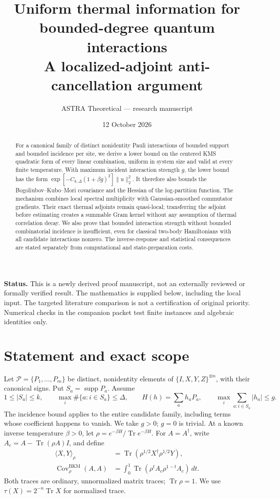 \documentclass[11pt]{article}
\title{Uniform thermal information for bounded-degree quantum interactions\\[4pt]\large A localized-adjoint anti-cancellation argument}
\author{ASTRA Theoretical --- research manuscript}
\date{12 October 2026}
\theoremstyle{remark}\newtheorem{remark}[theorem]{Remark}
\DeclareMathOperator{\Tr}{Tr}\DeclareMathOperator{\supp}{supp}\DeclareMathOperator{\ad}{ad}\DeclareMathOperator{\Var}{Var}\DeclareMathOperator{\Cov}{Cov}\DeclareMathOperator{\rank}{rank}\DeclareMathOperator{\dist}{dist}
\newcommand{\ip}[2]{\langle #1,#2\rangle_\rho}
\begin{document}
\maketitle
\begin{abstract}
For a canonical family of distinct nonidentity Pauli interactions of bounded support and bounded incidence per site, we derive a lower bound on the centered KMS quadratic form of every linear combination, uniform in system size and valid at every finite temperature. With maximum incident interaction strength $g$, the lower bound has the form $\exp[-C_{k,\Delta}(1+\beta g)^2]\|u\|_2^2$. It therefore also bounds the Bogoliubov--Kubo--Mori covariance and the Hessian of the log-partition function. The mechanism combines local spectral multiplicity with Gaussian-smoothed commutator gradients. Their exact thermal adjoints remain quasi-local; transferring the adjoint before estimating creates a summable Gram kernel without any assumption of thermal correlation decay. We also prove that bounded interaction strength without bounded combinatorial incidence is insufficient, even for classical two-body Hamiltonians with all candidate interactions nonzero. The inverse-response and statistical consequences are stated separately from computational and state-preparation costs.
\end{abstract}
\noindent\textbf{Status.} This is a newly derived proof manuscript, not an externally reviewed or formally verified result. The mathematics is supplied below, including the local input. The targeted literature comparison is not a certification of original priority. Numerical checks in the companion packet test finite instances and algebraic identities only.

\section{Statement and exact scope}
Let $\mathcal P=\{P_1,\ldots,P_m\}$ be distinct, nonidentity elements of $\{I,X,Y,Z\}^{\otimes n}$, with their canonical signs. Put $S_a=\supp P_a$. Assume
\begin{equation}\label{eq:assumptions}
 1\le |S_a|\le k,\qquad
 \max_i\#\{a:i\in S_a\}\le\Delta,\qquad
 H(h)=\sum_a h_aP_a,\qquad
 \max_i\sum_{a:i\in S_a}|h_a|\le g.
\end{equation}
The incidence bound applies to the entire candidate family, including terms whose coefficient happens to vanish. We take $g>0$; $g=0$ is trivial. At a known inverse temperature $\beta>0$, let $\rho=e^{-\beta H}/\Tr e^{-\beta H}$. For $A=A^\dagger$, write $A_c=A-\Tr(\rho A)I$, and define
\begin{align}
 \ip{X}{Y}&=\Tr(\rho^{1/2}X^\dagger\rho^{1/2}Y),\\
 \Cov_\rho^{\mathrm{BKM}}(A,A)
 &=\int_0^1\Tr(\rho^t A_c\rho^{1-t}A_c)\,dt.
\end{align}
Both traces are ordinary, unnormalized matrix traces; $\Tr\rho=1$. We use $\tau(X)=2^{-n}\Tr X$ for normalized trace.
\end{document}
